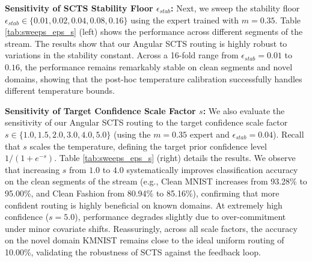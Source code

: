 \documentclass{article}
\theoremstyle{plain}
\theoremstyle{definition}
\theoremstyle{remark}
\begin{document}
\textbf{Sensitivity of SCTS Stability Floor $\epsilon_{stab}$:} Next, we sweep the stability floor $\epsilon_{stab} \in \{0.01, 0.02, 0.04, 0.08, 0.16\}$ using the expert trained with $m=0.35$. Table \ref{tab:sweeps_eps_s} (left) shows the performance across different segments of the stream. The results show that our Angular SCTS routing is highly robust to variations in the stability constant. Across a 16-fold range from $\epsilon_{stab}=0.01$ to $0.16$, the performance remains remarkably stable on clean segments and novel domains, showing that the post-hoc temperature calibration successfully handles different temperature bounds.

\textbf{Sensitivity of Target Confidence Scale Factor $s$:} We also evaluate the sensitivity of our Angular SCTS routing to the target confidence scale factor $s \in \{1.0, 1.5, 2.0, 3.0, 4.0, 5.0\}$ (using the $m=0.35$ expert and $\epsilon_{stab}=0.04$). Recall that $s$ scales the temperature, defining the target prior confidence level $1 / (1 + e^{-s})$. Table \ref{tab:sweeps_eps_s} (right) details the results. We observe that increasing $s$ from $1.0$ to $4.0$ systematically improves classification accuracy on the clean segments of the stream (e.g., Clean MNIST increases from 93.28\% to 95.00\%, and Clean Fashion from 80.94\% to 85.16\%), confirming that more confident routing is highly beneficial on known domains. At extremely high confidence ($s=5.0$), performance degrades slightly due to over-commitment under minor covariate shifts. Reassuringly, across all scale factors, the accuracy on the novel domain KMNIST remains close to the ideal uniform routing of 10.00\%, validating the robustness of SCTS against the feedback loop.
\end{document}
